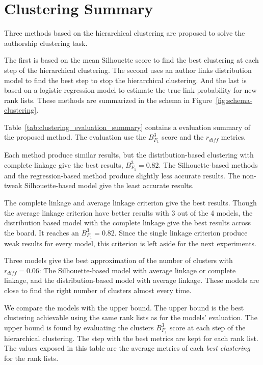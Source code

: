 \section{Clustering Summary}

Three methods based on the hierarchical clustering are proposed to solve the authorship clustering task.

The first is based on the mean Silhouette score to find the best clustering at each step of the hierarchical clustering.
The second uses an author links distribution model to find the best step to stop the hierarchical clustering.
And the last is based on a logistic regression model to estimate the true link probability for new rank lists.
These methods are summarized in the schema in Figure~\ref{fig:schema-clustering}.

Table~\ref{tab:clustering_evaluation_summary} contains a evaluation summary of the proposed method.
The evaluation use the $B^3_{F_1}$ score and the $r_{diff}$ metrics.

Each method produce similar results, but the distribution-based clustering with complete linkage give the best results, $B^3_{F_1} = 0.82$.
The Silhouette-based methods and the regression-based method produce slightly less accurate results.
The non-tweak Silhouette-based model give the least accurate results.

The complete linkage and average linkage criterion give the best results.
Though the average linkage criterion have better results with 3 out of the 4 models, the distribution based model with the complete linkage give the best results across the board.
It reaches an $B^3_{F_1} = 0.82$.
Since the single linkage criterion produce weak results for every model, this criterion is left aside for the next experiments.

Three models give the best approximation of the number of clusters with $r_{diff} = 0.06$:
The Silhouette-based model with average linkage or complete linkage, and the distribution-based model with average linkage.
These models are close to find the right number of clusters almost every time.

We compare the models with the upper bound.
The upper bound is the best clustering achievable using the same rank lists as for the models' evaluation.
The upper bound is found by evaluating the clusters $B^3_{F_1}$ score at each step of the hierarchical clustering.
The step with the best metrics are kept for each rank list.
The values exposed in this table are the average metrics of each \textit{best clustering} for the rank lists.

